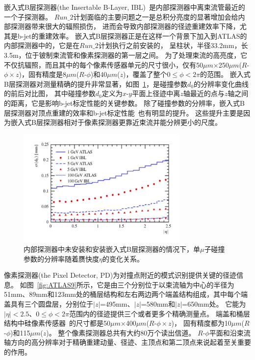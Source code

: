 嵌入式B层探测器(the Insertable B-Layer, IBL)~\cite{ATLASIBL}是内部探测器中离束流管最近的一个子探测器。
$Run\_2$计划面临的主要问题之一是总积分亮度的显著增加会给内部探测器带来很大的辐照损伤，
进而会导致内部探测器的径迹重建效率下降，尤其是b-jet的重建效率。
嵌入式B层探测器正是在这样一个背景下加入到ATLAS的内部探测器中的，它是在$Run\_2$计划执行之前安装的，
呈柱状，半径33.2mm，长3.5m，位于铍制束流管和像素探测器的第一层之间。
为了处理束流的高亮度，它不仅抗辐照，而且其中的每个像素传感器单元的尺寸很小，仅有50$\mu m$×250$\mu m$($R$-$\phi\times z$)，固有精度是8$\mu m$($R$-$\phi$)和40$\mu m$($z$)，覆盖了整个$0\le\phi<2\pi$的范围。
嵌入式B层探测器对测量精确的提升非常显著，如图~\ref{fig:ATLAS8}，是碰撞参数$d_0$的分辨率变化曲线的前后对比图，
其中碰撞参数$d_0$定义为$x$-$y$平面上径迹中离$z$轴最近的点与$z$轴之间的距离，它是影响b-jet标定性能的关键参数。
除了碰撞参数的分辨率，嵌入式B层探测器对顶点重建的效率和b-jet标定性能~\cite{IBLBP}也有明显的提升。
这些提升主要是因为嵌入式B层探测器相对于像素探测器更靠近束流并能分辨更小的尺度。

\begin{figure}
  \begin{center}
    \includegraphics[width=0.75\textwidth]{figuresEXP/ATLAS8.jpg}
  \end{center}
  \caption{
 内部探测器中未安装和安装嵌入式B层探测器的情况下，单$\mu$子碰撞参数的分辨率随着赝快度$\eta$的变化关系。
  }
    \label{fig:ATLAS8}
\end{figure}

像素探测器(the Pixel Detector, PD)为对撞点附近的模式识别提供关键的径迹信息。
如图~\ref{fig:ATLAS9}所示，它是由三个分别位于以束流轴为中心的半径为51mm、89mm和123mm处的桶层结构和左右两边两个端盖结构组成，其中每个端盖具有三个圆盘层，分别位于$|z|$=495mm、$|z|$=580mm和$|z|$=650mm处。
它能为$|\eta|<2.5$、$0\le\phi<2\pi$范围内的径迹提供三个或者更多个精确测量点。
端盖和桶层结构中硅像素传感器~\cite{PDSS}的尺寸都是50$\mu m$×400$\mu m$($R$-$\phi\times z$)，
固有精度都为10$\mu m$($R$-$\phi$)和115$\mu m$($z$)。
整个像素探测器总共有大约80万个读出信道。
$R$-$\phi$平面和沿束流轴方向的高分辨率对于精确重建动量、径迹、主顶点和第二顶点来说起着至关重要的作用。

